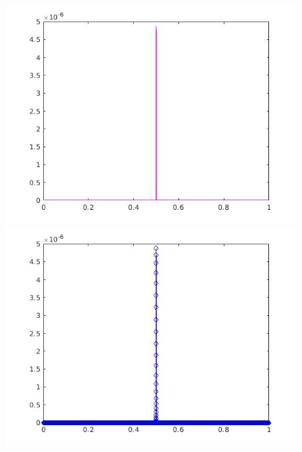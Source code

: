 \documentclass[a4paper,11pt]{article}
\begin{document}
\begin{figure}[!hp]
\centering
\begin{minipage}{.5\textwidth}
  \centering
  \includegraphics[width=1\linewidth]{images/lab2_43.jpg}
\end{minipage}%
\begin{minipage}{.5\textwidth}
  \centering
  \includegraphics[width=1\linewidth]{images/lab2_44.jpg}
\end{minipage}
\end{figure}
\end{document}
